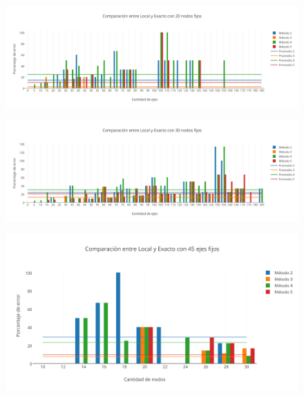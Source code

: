   \begin{figure}[h!]
   \begin{center}
 	\includegraphics[scale=0.55]{imagenes/local/exacto/20nodos.png}
   \end{center}
 \end{figure}
 
   \begin{figure}[h!]
   \begin{center}
 	\includegraphics[scale=0.55]{imagenes/local/exacto/30nodos.png}
   \end{center}
 \end{figure}

\newpage

  \begin{figure}[h!]
   \begin{center}
 	\includegraphics[scale=0.7]{imagenes/local/exacto/45ejes.png}
   \end{center}
 \end{figure} 
 
